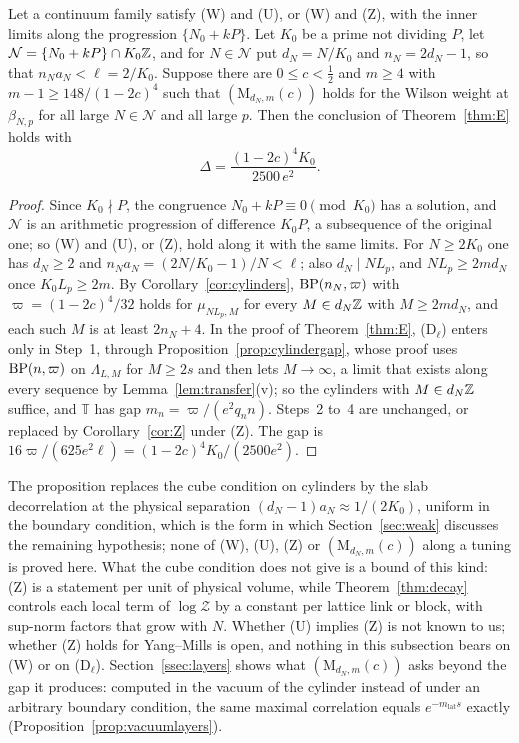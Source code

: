 \begin{proposition}\label{prop:bridgeM}
Let a continuum family satisfy \textup{(W)} and \textup{(U)}, or \textup{(W)}
and \textup{(Z)}, with the inner limits along the progression $\{N_0+kP\}$.
Let $K_0$ be a prime not dividing $P$, let $\mathcal N=\{N_0+kP\}\cap K_0\mathbb{Z}$,
and for $N\in\mathcal N$ put $d_N=N/K_0$ and $n_N=2d_N-1$, so that $n_Na_N<
\ell=2/K_0$. Suppose there are $0\le c<\frac12$ and $m\ge4$ with $m-1\ge
148/(1-2c)^4$ such that $(\mathrm M_{d_N,m}(c))$ holds for the Wilson weight
at $\beta_{N,p}$ for all large $N\in\mathcal N$ and all large $p$. Then the
conclusion of Theorem~\ref{thm:E} holds with
\[
\Delta=\frac{(1-2c)^4K_0}{2500\,e^2}.
\]
\end{proposition}

\begin{proof}
Since $K_0\nmid P$, the congruence $N_0+kP\equiv0\pmod{K_0}$ has a solution,
and $\mathcal N$ is an arithmetic progression of difference $K_0P$, a
subsequence of the original one; so (W) and (U), or (Z), hold along it with
the same limits. For $N\ge2K_0$ one has $d_N\ge2$ and $n_Na_N=(2N/K_0-1)/N<
\ell$; also $d_N\mid NL_p$, and $NL_p\ge2md_N$ once $K_0L_p\ge2m$. By
Corollary~\ref{cor:cylinders}, $\mathrm{BP}(n_N,\varpi)$ with $\varpi=(1-2c)^4/32$
holds for $\mu_{NL_p,M}$ for every $M\in d_N\mathbb{Z}$ with $M\ge2md_N$, and each
such $M$ is at least $2n_N+4$. In the proof of Theorem~\ref{thm:E},
(D$_\ell$) enters only in Step~1, through Proposition~\ref{prop:cylindergap},
whose proof uses $\mathrm{BP}(n,\varpi)$ on $\Lambda_{L,M}$ for $M\ge2s$ and then
lets $M\to\infty$, a limit that exists along every sequence by
Lemma~\ref{lem:transfer}(v); so the cylinders with $M\in d_N\mathbb{Z}$ suffice, and
$\mathbb T$ has gap $m_n=\varpi/(e^2q_nn)$. Steps~2 to~4 are unchanged, or
replaced by Corollary~\ref{cor:Z} under (Z). The gap is $16\varpi/(625e^2
\ell)=(1-2c)^4K_0/(2500e^2)$.
\end{proof}

The proposition replaces the cube condition on cylinders by the slab
decorrelation at the physical separation $(d_N-1)a_N\approx1/(2K_0)$,
uniform in the boundary condition, which is the form in which
Section~\ref{sec:weak} discusses the remaining hypothesis; none of (W), (U),
(Z) or $(\mathrm M_{d_N,m}(c))$ along a tuning is proved here. What
the cube condition does not give is a bound of this kind: (Z) is a statement
per unit of physical volume, while Theorem~\ref{thm:decay} controls each
local term of $\log\mathcal Z$ by a constant per lattice link or block,
with sup-norm factors that grow with $N$. Whether (U) implies (Z) is not
known to us; whether (Z) holds for Yang--Mills is open, and nothing in this
subsection bears on (W) or on (D$_\ell$). Section~\ref{ssec:layers} shows
what $(\mathrm M_{d_N,m}(c))$ asks beyond the gap it produces: computed in
the vacuum of the cylinder instead of under an arbitrary boundary
condition, the same maximal correlation equals $e^{-m_{\mathrm{lat}}s}$
exactly (Proposition~\ref{prop:vacuumlayers}).

